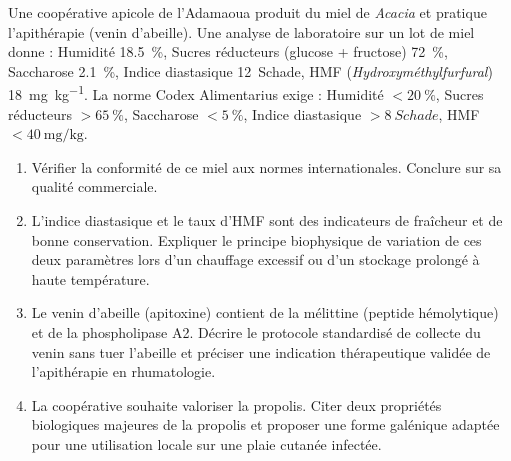 \documentclass[11pt]{article}
\begin{document}
\begin{exercice}
Une coopérative apicole de l'Adamaoua produit du miel de \textit{Acacia} et pratique l'apithérapie (venin d'abeille). Une analyse de laboratoire sur un lot de miel donne : Humidité \SI{18,5}{\%}, Sucres réducteurs (glucose + fructose) \SI{72}{\%}, Saccharose \SI{2,1}{\%}, Indice diastasique \SI{12}{\unit{Schade}}, HMF (\textit{Hydroxyméthylfurfural}) \SI{18}{\milli\gram\per\kilo\gram}. La norme Codex Alimentarius exige : Humidité $< \SI{20}{\%}$, Sucres réducteurs $> \SI{65}{\%}$, Saccharose $< \SI{5}{\%}$, Indice diastasique $> \SI{8}{\unit{Schade}}$, HMF $< \SI{40}{\milli\gram\per\kilo\gram}$.

\begin{enumerate}
\item Vérifier la conformité de ce miel aux normes internationales. Conclure sur sa qualité commerciale.
\item L'indice diastasique et le taux d'HMF sont des indicateurs de fraîcheur et de bonne conservation. Expliquer le principe biophysique de variation de ces deux paramètres lors d'un chauffage excessif ou d'un stockage prolongé à haute température.
\item Le venin d'abeille (apitoxine) contient de la mélittine (peptide hémolytique) et de la phospholipase A2. Décrire le protocole standardisé de collecte du venin sans tuer l'abeille et préciser une indication thérapeutique validée de l'apithérapie en rhumatologie.
\item La coopérative souhaite valoriser la propolis. Citer deux propriétés biologiques majeures de la propolis et proposer une forme galénique adaptée pour une utilisation locale sur une plaie cutanée infectée.
\end{enumerate}
\end{exercice}
\end{document}
